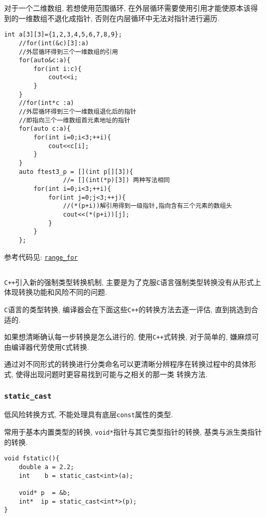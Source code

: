 对于一个二维数组, 若想使用范围循环, 在外层循环需要使用引用才能使原本该得到的一维数组不退化成指针, 否则在内层循环中无法对指针进行遍历.

\begin{lstlisting}[xleftmargin=2em,xrightmargin=2em]
	int a[3][3]={1,2,3,4,5,6,7,8,9};
	//for(int(&c)[3]:a)
	//外层循环得到三个一维数组的引用
	for(auto&c:a){
		for(int i:c){
			cout<<i;
		}
	}
	//for(int*c :a)
	//外层循环得到三个一维数组退化后的指针
	//即指向三个一维数组首元素地址的指针
	for(auto c:a){
		for(int i=0;i<3;++i){
			cout<<c[i];
		}
	}
	auto ftest3_p = [](int p[][3]){
		        //= [](int(*p)[3]) 两种写法相同
		for(int i=0;i<3;++i){
			for(int j=0;j<3;++j){
				//(*(p+i))解引用得到一级指针,指向含有三个元素的数组头
				cout<<(*(p+i))[j];
			}
		}
	};
\end{lstlisting}

参考代码见: \href{https://github.com/wenqingqian/Obtuse/blob/main/test/cpp/c++11/range_for.cpp}{\tt range\_for}
\subsection{\color{purple}{强制类型转换}}
{\tt C++}引入新的强制类型转换机制, 主要是为了克服{\tt C}语言强制类型转换没有从形式上体现转换功能和风险不同的问题.

{\tt C}语言的类型转换, 编译器会在下面这些{\tt C++}的转换方法去逐一评估, 直到挑选到合适的. 

如果想清晰确认每一步转换是怎么进行的, 使用{\tt C++}式转换, 对于简单的, 嫌麻烦可由编译器代劳使用{\tt C}式转换.

通过对不同形式的转换进行分类命名可以更清晰分辨程序在转换过程中的具体形式, 使得出现问题时更容易找到可能与之相关的那一类
	转换方法. 
\subsubsection{\tt{static\_cast}}
\begin{paracol}{2}
	\begin{leftcolumn}
		低风险转换方式, 不能处理具有底层{\tt const}属性的类型.

		常用于基本内置类型的转换, {\tt void*}指针与其它类型指针的转换, 基类与派生类指针的转换.
	\end{leftcolumn}	
	\begin{rightcolumn}
		\begin{lstlisting}[xleftmargin=2em,xrightmargin=2em]
void fstatic(){
	double a = 2.2;
	int    b = static_cast<int>(a);

	void* p  = &b;
	int*  ip = static_cast<int*>(p);
}
		\end{lstlisting}
	\end{rightcolumn}
\end{paracol}
